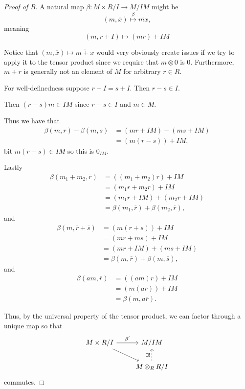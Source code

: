 \documentclass[11pt]{article}
\begin{document}
\begin{proof}[Proof of B]
    A natural map $\beta : M \times R/I \to M/IM$ 
    might be 
    \[
        (m, \overline x) \overset\beta\mapsto 
        \overline{mx}, 
    \]
    meaning 
    \[
        (m, r + I) \mapsto (mr) + IM 
    \]

    Notice that $(m,\overline x) \mapsto \overline{m + x}$ 
    would very obviously create issues if 
    we try to apply it to the tensor product since 
    we require that $m \otimes 0$ is $0$. 
    Furthermore, $m + r$ is generally not an element 
    of $M$ for arbitrary $r \in R$. 

    For well-definedness suppose 
    $r + I = s + I$. 
    Then $r-s \in I$. 

    Then $(r-s)m \in IM$ since 
    $r-s \in I$ and $m \in M$. 

    Thus we have that 
    \begin{align*}
        \beta(m, r) - \beta(m, s) 
        &= (mr + IM) - (ms + IM) \\ 
        &= (m(r-s)) + IM, 
    \end{align*}  
    bit $m(r-s) \in IM$ so this is $0_{IM}$. 

    Lastly 
    \begin{align*}
        \beta(m_1 + m_2, \overline r) 
        &= ((m_1 + m_2)r) + IM \\ 
        &= (m_1r + m_2r) + IM \\ 
        &= (m_1r + IM) + (m_2r + IM) \\ 
        &= \beta(m_1, \overline r) + \beta(m_2, \overline r),  
    \end{align*}
    and 
    \begin{align*}
        \beta(m, \overline r + \overline s) 
        &= (m(r + s)) + IM \\ 
        &= (mr + ms) + IM \\
        &= (mr + IM) + (ms + IM) \\  
        &= \beta(m, \overline r) + \beta(m, \overline s), 
    \end{align*}
    and 
    \begin{align*}
        \beta(am, \overline r) 
        &= ((am)r) + IM \\ 
        &= (m(ar)) + IM \\ 
        &= \beta(m, a\overline r).  
    \end{align*}

    Thus, by the universal property of 
    the tensor product, we 
    can factor through a unique map so that 
    \[
        \begin{tikzcd}
            M \times R/I \ar[dr] 
            \ar[r, "\beta'"] & M/IM \\ 
                & M \otimes_R R/I \ar[u,dashed, "\exists!"]
        \end{tikzcd}
    \]
    commutes. 
\end{proof}
\end{document}
